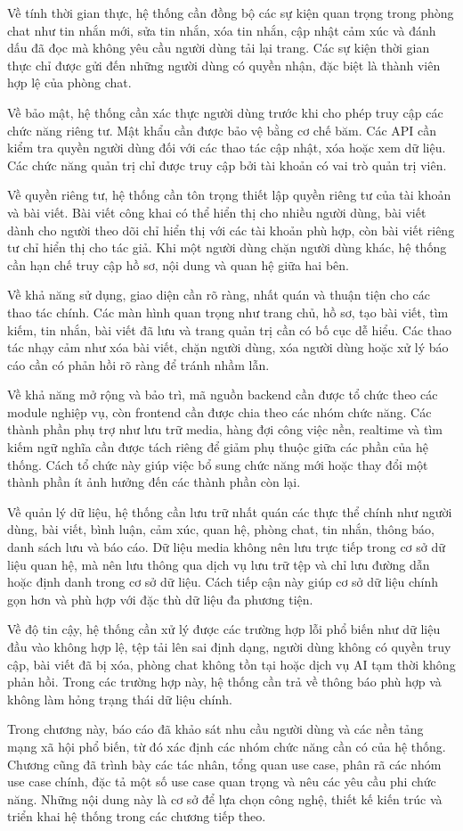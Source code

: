 \documentclass[../DoAn.tex]{subfiles}
\begin{document}
Về tính thời gian thực, hệ thống cần đồng bộ các sự kiện quan trọng trong phòng chat như tin nhắn mới, sửa tin nhắn, xóa tin nhắn, cập nhật cảm xúc và đánh dấu đã đọc mà không yêu cầu người dùng tải lại trang. Các sự kiện thời gian thực chỉ được gửi đến những người dùng có quyền nhận, đặc biệt là thành viên hợp lệ của phòng chat.

Về bảo mật, hệ thống cần xác thực người dùng trước khi cho phép truy cập các chức năng riêng tư. Mật khẩu cần được bảo vệ bằng cơ chế băm. Các API cần kiểm tra quyền người dùng đối với các thao tác cập nhật, xóa hoặc xem dữ liệu. Các chức năng quản trị chỉ được truy cập bởi tài khoản có vai trò quản trị viên.

Về quyền riêng tư, hệ thống cần tôn trọng thiết lập quyền riêng tư của tài khoản và bài viết. Bài viết công khai có thể hiển thị cho nhiều người dùng, bài viết dành cho người theo dõi chỉ hiển thị với các tài khoản phù hợp, còn bài viết riêng tư chỉ hiển thị cho tác giả. Khi một người dùng chặn người dùng khác, hệ thống cần hạn chế truy cập hồ sơ, nội dung và quan hệ giữa hai bên.

Về khả năng sử dụng, giao diện cần rõ ràng, nhất quán và thuận tiện cho các thao tác chính. Các màn hình quan trọng như trang chủ, hồ sơ, tạo bài viết, tìm kiếm, tin nhắn, bài viết đã lưu và trang quản trị cần có bố cục dễ hiểu. Các thao tác nhạy cảm như xóa bài viết, chặn người dùng, xóa người dùng hoặc xử lý báo cáo cần có phản hồi rõ ràng để tránh nhầm lẫn.

Về khả năng mở rộng và bảo trì, mã nguồn backend cần được tổ chức theo các module nghiệp vụ, còn frontend cần được chia theo các nhóm chức năng. Các thành phần phụ trợ như lưu trữ media, hàng đợi công việc nền, realtime và tìm kiếm ngữ nghĩa cần được tách riêng để giảm phụ thuộc giữa các phần của hệ thống. Cách tổ chức này giúp việc bổ sung chức năng mới hoặc thay đổi một thành phần ít ảnh hưởng đến các thành phần còn lại.

Về quản lý dữ liệu, hệ thống cần lưu trữ nhất quán các thực thể chính như người dùng, bài viết, bình luận, cảm xúc, quan hệ, phòng chat, tin nhắn, thông báo, danh sách lưu và báo cáo. Dữ liệu media không nên lưu trực tiếp trong cơ sở dữ liệu quan hệ, mà nên lưu thông qua dịch vụ lưu trữ tệp và chỉ lưu đường dẫn hoặc định danh trong cơ sở dữ liệu. Cách tiếp cận này giúp cơ sở dữ liệu chính gọn hơn và phù hợp với đặc thù dữ liệu đa phương tiện.

Về độ tin cậy, hệ thống cần xử lý được các trường hợp lỗi phổ biến như dữ liệu đầu vào không hợp lệ, tệp tải lên sai định dạng, người dùng không có quyền truy cập, bài viết đã bị xóa, phòng chat không tồn tại hoặc dịch vụ AI tạm thời không phản hồi. Trong các trường hợp này, hệ thống cần trả về thông báo phù hợp và không làm hỏng trạng thái dữ liệu chính.

Trong chương này, báo cáo đã khảo sát nhu cầu người dùng và các nền tảng mạng xã hội phổ biến, từ đó xác định các nhóm chức năng cần có của hệ thống. Chương cũng đã trình bày các tác nhân, tổng quan use case, phân rã các nhóm use case chính, đặc tả một số use case quan trọng và nêu các yêu cầu phi chức năng. Những nội dung này là cơ sở để lựa chọn công nghệ, thiết kế kiến trúc và triển khai hệ thống trong các chương tiếp theo.
\end{document}
